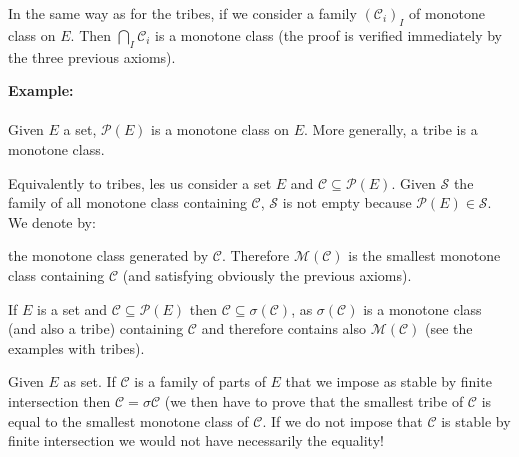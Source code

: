 	In the same way as for the tribes, if we consider a family $(\mathcal{C}_i)_I$ of monotone class on $E$. Then $\bigcap_I \mathcal{C}_i$ is a monotone class (the proof is verified immediately by the three previous axioms).
	\begin{tcolorbox}[colframe=black,colback=white,sharp corners]
	\textbf{{\Large {}}Example:}\\\\
	Given $E$ a set, $\mathcal{P}(E)$ is a monotone class on $E$. More generally, a tribe is a monotone class.

	Equivalently to tribes, les us consider a set $E$ and $\mathcal{C}\subseteq \mathcal{P}(E)$. Given $\mathcal{S}$ the family of all monotone class containing $\mathcal{C}$, $\mathcal{S}$ is not empty because $\mathcal{P}(E)\in \mathcal{S}$. We denote by:
	
	the monotone class generated by $\mathcal{C}$. Therefore $\mathcal{M}(\mathcal{C})$ is the smallest monotone class containing $\mathcal{C}$ (and satisfying obviously the previous axioms).
	\end{tcolorbox}
	\begin{tcolorbox}[title=Remark,colframe=black,arc=10pt]
	If $E$ is a set and $\mathcal{C}\subseteq \mathcal{P}(E)$ then $\mathcal{C}\subseteq \sigma(\mathcal{C})$, as $\sigma(\mathcal{C})$ is a monotone class (and also a tribe) containing $\mathcal{C}$ and therefore contains also $\mathcal{M}(\mathcal{C})$ (see the examples with tribes).
	\end{tcolorbox}	
	 \begin{theorem}
	Given $E$ as set. If $\mathcal{C}$ is a family of parts of $E$ that we impose as stable by finite intersection then $\mathcal{C}=\sigma{\mathcal{C}}$ (we then have to prove that the smallest tribe of $\mathcal{C}$ is equal to the smallest monotone class of $\mathcal{C}$. If we do not impose that $\mathcal{C}$ is stable by finite intersection we would not have necessarily the equality!
	\end{theorem}
